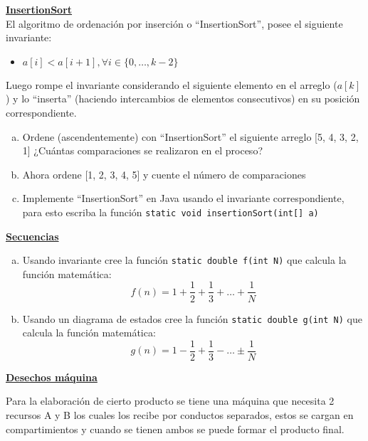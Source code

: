 \documentclass[dcc,uchile]{fcfmcourse}
\begin{document}
\begin{problems}
\problem \underline{\textbf{InsertionSort}}\\
El algoritmo de ordenación por inserción o ``InsertionSort'', posee el siguiente invariante:
\begin{itemize}
    \item $a[i] < a[i+1], \forall i \in \{0,\ldots, k-2\}$
\end{itemize}
Luego rompe el invariante considerando el siguiente elemento en el arreglo ($a[k]$) y lo ``inserta'' (haciendo intercambios de elementos consecutivos) en su posición correspondiente.
\begin{enumerate}[a)]
    \item Ordene (ascendentemente) con ``InsertionSort'' el siguiente arreglo [5, 4, 3, 2, 1] ¿Cuántas comparaciones se realizaron en el proceso?
    \item Ahora ordene [1, 2, 3, 4, 5] y cuente el número de comparaciones
    \item Implemente ``InsertionSort'' en Java usando el invariante correspondiente, para esto escriba la función \texttt{static void insertionSort(int[] a)}
\end{enumerate}
\newpage
\problem \underline{\textbf{Secuencias}}
\begin{enumerate}[a)]
    \item Usando invariante cree la función \texttt{static double f(int N)} que calcula la función matemática:
    \begin{equation*}
        f(n) = 1 + \frac{1}{2} + \frac{1}{3} + \ldots + \frac{1}{N}
    \end{equation*}
    \item Usando un diagrama de estados cree la función \texttt{static double g(int N)} que calcula la función matemática:
    \begin{equation*}
        g(n) = 1 - \frac{1}{2} + \frac{1}{3} - \ldots \pm \frac{1}{N}
    \end{equation*}
\end{enumerate}

\problem \underline{\textbf{Desechos máquina}}

Para la elaboración de cierto producto se tiene una máquina que necesita 2 recursos A y B los cuales los recibe por conductos separados, estos se cargan en compartimientos y cuando se tienen ambos se puede formar el producto final.


\end{problems}
\end{document}
